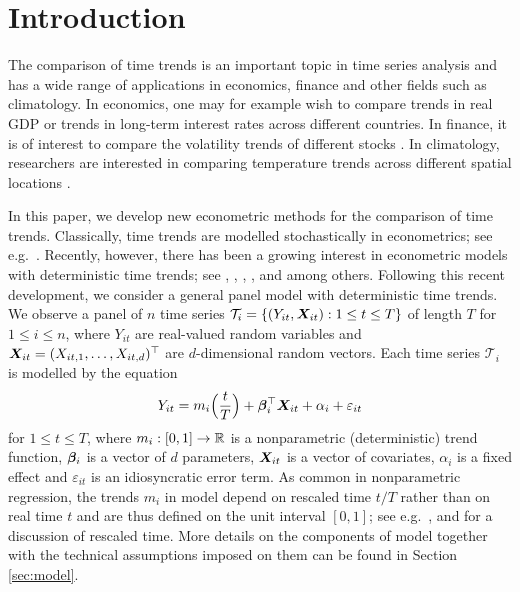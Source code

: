 \documentclass[12pt]{article}
\makeatletter
\renewcommand{\eqref}[1]{\tagform@{\ref{#1}}}
\makeatother
\begin{document}
\newpage
{} %

\allowdisplaybreaks[1]

\setlength{\abovedisplayskip}{3pt}
\setlength{\belowdisplayskip}{3pt}



\section{Introduction}\label{sec:intro}


The comparison of time trends is an important topic in time series analysis and has a wide range of applications in economics, finance and other fields such as climatology. In economics, one may for example wish to compare trends in real GDP \citep[][]{Grier1989} or trends in long-term interest rates \citep[][]{Christiansen1997} across different countries. In finance, it is of interest to compare the volatility trends of different stocks \citep[][]{Nyblom2000}. In climatology, researchers are interested in comparing temperature trends across different spatial locations \citep[][]{KarolyWu2005}. 


In this paper, we develop new econometric methods for the comparison of time trends. Classically, time trends are modelled stochastically in econometrics; see e.g.\ \cite{Stock1988}. Recently, however, there has been a growing interest in econometric models with deterministic time trends; see \cite{Cai2007}, \cite{Atak2011}, \cite{Robinson2012}, \cite{ChenGaoLi2012}, \cite{Zhang2012} and \cite{Hidalgo2014} among others. Following this recent development, we consider a general panel model with deterministic time trends. We observe a panel of $n$ time series $\mathcal{T}_i = \{(Y_{it}, \boldsymbol{X}_{it}): 1 \le t \le T \}$ of length $T$ for $1 \le i \le n$, where $Y_{it}$ are real-valued random variables and $\boldsymbol{X}_{it} = (X_{it,1},\ldots,X_{it,d})^\top$ are $d$-dimensional random vectors. Each time series $\mathcal{T}_i$ is modelled by the equation 
\begin{equation}\label{eq:model_full}
Y_{it} = m_i \Big( \frac{t}{T} \Big) + \bm{\beta}^\top_i \boldsymbol{X}_{it} + \alpha_i + \varepsilon_{it} 
\end{equation}
for $1 \le t \le T$, where $m_i: [0,1] \to \mathbb{R}$ is a nonparametric (deterministic) trend function, $\bm{\beta}_i$ is a vector of $d$ parameters, $\boldsymbol{X}_{it}$ is a vector of covariates, $\alpha_i$ is a fixed effect and $\varepsilon_{it}$ is an idiosyncratic error term. As common in nonparametric regression, the trends $m_i$ in model \eqref{eq:model_full} depend on rescaled time $t/T$ rather than on real time $t$ and are thus defined on the unit interval $[0,1]$; see e.g.\ \cite{Robinson1989}, \cite{Dahlhaus1997} and \cite{VogtLinton2014} for a discussion of rescaled time. More details on the components of model \eqref{eq:model_full} together with the technical assumptions imposed on them can be found in Section \ref{sec:model}.
\end{document}
